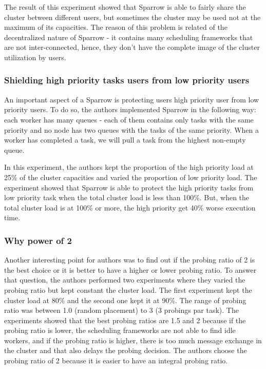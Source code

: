 \documentclass[11pt]{article}
\begin{document}
            The result of this experiment showed that Sparrow is able to fairly share the cluster between different users, but sometimes the cluster may be used not at the maximum of its capacities. The reason of this problem is related of the decentralized nature of Sparrow - it contains many scheduling frameworks that are not inter-connected, hence, they don't have the complete image of the cluster utilization by users.
        
        
        \subsubsection*{Shielding high priority tasks users from low priority users}
        	 \label{preemption}
        	
            An important aspect of a Sparrow is protecting users high priority user from low priority users. To do so, the authors implemented Sparrow in the following way: each worker has many queues - each of them contains only tasks with the same priority and no node has two queues with the tasks of the same priority. When a worker has completed a task, we will pull a task from the highest non-empty queue.
            
            In this experiment, the authors kept the proportion of the high priority load at 25\% of the cluster capacities and varied the proportion of low priority load. The experiment showed that Sparrow is able to protect the high priority tasks from low priority task when the total cluster load is less than 100\%. But, when the total cluster load is at 100\% or more, the high priority get 40\% worse execution time.
        
        
        \subsubsection*{Why power of 2}
        	\label{probingratio}
        
        	Another interesting point for authors was to find out if the probing ratio of 2 is the best choice or it is better to have a higher or lower probing ratio. To answer that question, the authors performed two experiments where they varied the probing ratio but kept constant the cluster load. The first experiment kept the cluster load at 80\% and the second one kept it at 90\%. The range of probing ratio was between 1.0 (random placement) to 3 (3 probings par task). The experiments showed that the best probing ratios are 1.5 and 2 because if the probing ratio is lower, the scheduling frameworks are not able to find idle workers, and if the probing ratio is higher, there is too much message exchange in the cluster and that also delays the probing decision. The authors choose the probing ratio of 2 because it is easier to have an integral probing ratio.
\end{document}

